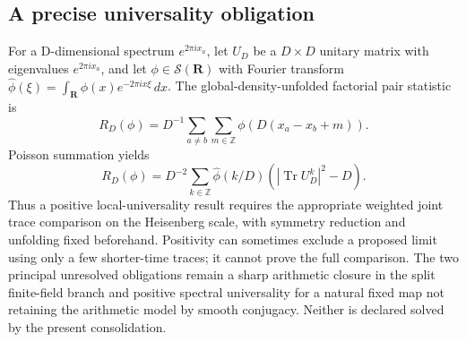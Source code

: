 \subsection{A precise universality obligation}
For a D-dimensional spectrum $e^{2\pi ix_a}$, let $U_D$ be a
$D\times D$ unitary matrix with eigenvalues $e^{2\pi ix_a}$, and let
$\phi\in\mathcal S(\mathbf R)$ with Fourier transform
$\widehat\phi(\xi)=\int_{\mathbf R}\phi(x)e^{-2\pi i x\xi}\,dx$.
The global-density-unfolded factorial pair statistic is
\[
 R_D(\phi)=D^{-1}\sum_{a\ne b}\sum_{m\in\mathbb Z}
                   \phi(D(x_a-x_b+m)).
\]
Poisson summation yields
\[
 R_D(\phi)=D^{-2}\sum_{k\in\mathbb Z}\widehat\phi(k/D)
                  (|\operatorname{Tr}U_D^k|^2-D).
\]
Thus a positive local-universality result requires the appropriate weighted
joint trace comparison on the Heisenberg scale, with symmetry reduction and
unfolding fixed beforehand. Positivity can sometimes exclude a proposed limit
using only a few shorter-time traces; it cannot prove the full comparison.
The two principal unresolved obligations remain a sharp arithmetic closure
in the split finite-field branch and positive spectral universality for a
natural fixed map not retaining the arithmetic model by smooth conjugacy.
Neither is declared solved by the present consolidation.

